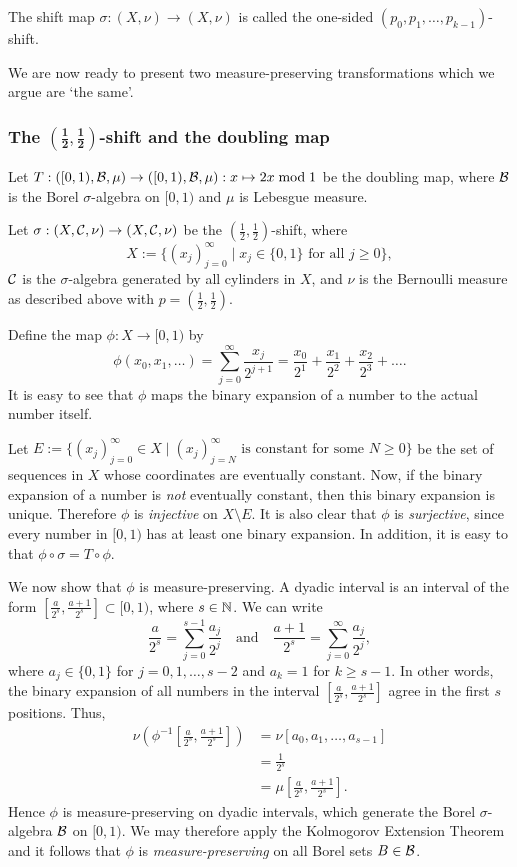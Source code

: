 The shift map $\sigma : (X, \nu) \to (X, \nu)$ is called the one-sided $(p_0, p_1, \dots, p_{k - 1})$-shift.

We are now ready to present two measure-preserving transformations which we argue are `the same'.

\subsubsection{The \texorpdfstring{$\mathbf{\left(\frac{1}{2}, \frac{1}{2}\right)}$}{(1/2, 1/2)}-shift and the doubling map}
Let $T : ([0, 1), \mathcal{B}, \mu) \to ([0, 1), \mathcal{B}, \mu) : x \mapsto 2x \bmod 1$ be the doubling map, where $\mathcal{B}$ is the Borel $\sigma$-algebra on $[0, 1)$ and $\mu$ is Lebesgue measure.

Let $\sigma : (X, \mathcal{C}, \nu) \to (X, \mathcal{C}, \nu)$ be the $\left(\frac{1}{2}, \frac{1}{2}\right)$-shift, where
\[
	X := \{(x_j)_{j = 0}^\infty \mid x_j \in \{0, 1\} \text{ for all } j \geq 0\},
\]
$\mathcal{C}$ is the $\sigma$-algebra generated by all cylinders in $X$, and $\nu$ is the Bernoulli measure as described above with $p = \left(\frac{1}{2}, \frac{1}{2}\right)$.

Define the map $\phi : X \to [0, 1)$ by
\[
	\phi(x_0, x_1, \dots) = \sum_{j = 0}^\infty{\frac{x_j}{2^{j + 1}}} = \frac{x_0}{2^1} + \frac{x_1}{2^2} + \frac{x_2}{2^3} + \dots.
\]
It is easy to see that $\phi$ maps the binary expansion of a number to the actual number itself.

Let $E := \{(x_j)_{j = 0}^\infty \in X \mid (x_j)_{j = N}^\infty \text{ is constant for some } N \geq 0\}$ be the set of sequences in $X$ whose coordinates are eventually constant. Now, if the binary expansion of a number is \emph{not} eventually constant, then this binary expansion is unique. Therefore $\phi$ is \emph{injective} on $X \setminus E$. It is also clear that $\phi$ is \emph{surjective}, since every number in $[0, 1)$ has at least one binary expansion. In addition, it is easy to that $\phi \circ \sigma = T \circ \phi$.

We now show that $\phi$ is measure-preserving. A dyadic interval is an interval of the form $\left[\frac{a}{2^s}, \frac{a + 1}{2^s}\right] \subset [0, 1)$, where $s \in \mathbb{N}$. We can write
\[
	\frac{a}{2^s} = \sum_{j = 0}^{s - 1}{\frac{a_j}{2^j}} \quad \text{and} \quad \frac{a + 1}{2^s} = \sum_{j = 0}^\infty{\frac{a_j}{2^j}},
\]
where $a_j \in \{0, 1\}$ for $j = 0, 1, \dots, s - 2$ and $a_k = 1$ for $k \geq s - 1$. In other words, the binary expansion of all numbers in the interval $\left[\frac{a}{2^s}, \frac{a + 1}{2^s}\right]$ agree in the first $s$ positions. Thus,
\begin{align*}
	\nu\left(\phi^{-1}\left[\frac{a}{2^s}, \frac{a + 1}{2^s}\right]\right) &= \nu[a_0, a_1, \dots, a_{s - 1}] \\
		&= \frac{1}{2^s} \\
		&= \mu\left[\frac{a}{2^s}, \frac{a + 1}{2^s}\right].
\end{align*}
Hence $\phi$ is measure-preserving on dyadic intervals, which generate the Borel $\sigma$-algebra $\mathcal{B}$ on $[0, 1)$. We may therefore apply the Kolmogorov Extension Theorem and it follows that $\phi$ is \emph{measure-preserving} on all Borel sets $B \in \mathcal{B}$.

